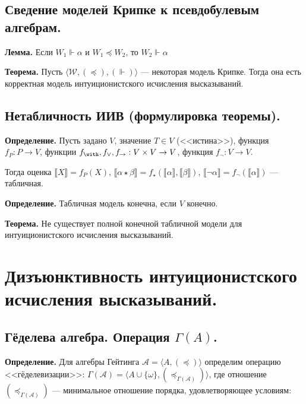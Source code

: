 \documentclass[10pt,a4paper,oneside]{article}
\begin{document}
\subsection{Сведение моделей Крипке к псевдобулевым алгебрам.}
\noindent \textbf{ Лемма. }
Если $W_1 \Vdash \alpha$ и $W_1 \preceq W_2$, то $W_2 \Vdash \alpha$

\noindent \textbf{ Теорема. }
Пусть $\langle \mathcal{W}, (\preceq), (\Vdash)\rangle$ ---
некоторая модель Крипке.
Тогда она есть корректная модель интуиционистского исчисления высказываний.


\subsection{Нетабличность ИИВ (формулировка теоремы).}

\noindent \textbf{ Определение. }
Пусть задано $V$, значение $T \in V$ (<<истина>>), функция $f_P: P \rightarrow V$, 
функции $f_\with, f_\vee, f_\rightarrow : V \times V \rightarrow V$,
функция $f_\neg: V \rightarrow V$.

Тогда оценка $\llbracket X \rrbracket = f_P(X)$, 
$\llbracket \alpha\star\beta \rrbracket = f_\star(\llbracket \alpha \rrbracket, \llbracket \beta \rrbracket)$,
$\llbracket \neg\alpha \rrbracket = f_\neg(\llbracket\alpha\rrbracket)$ --- табличная.

\noindent \textbf{ Определение. }
Табличная модель конечна, если $V$ конечно.

\noindent \textbf{ Теорема. }
Не существует полной конечной табличной модели для интуиционистского исчисления высказываний.

\section{Дизъюнктивность интуиционистского исчисления высказываний.}
\subsection{Гёделева алгебра. Операция $\Gamma(A)$.}
\noindent \textbf{ Определение. }
Для алгебры Гейтинга $\mathcal{A} = \langle A, (\preceq) \rangle$ определим операцию <<гёделевизации>>: 
$\Gamma(\mathcal{A}) = \langle A\cup\{\omega\}, (\preceq_{\Gamma(\mathcal{A})}) \rangle$, где
отношение $(\preceq_{\Gamma(\mathcal{A})})$ --- минимальное отношение порядка,
удовлетворяющее условиям:
\end{document}
